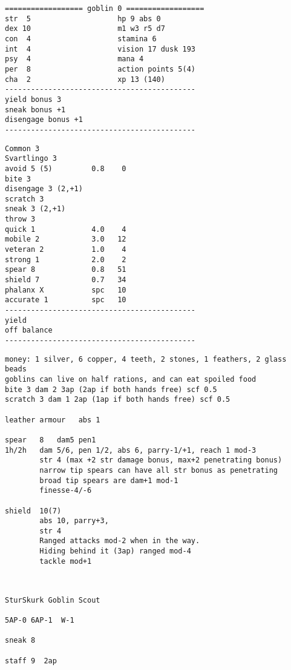 \begin{verbatim}
================== goblin 0 ==================
str  5                    hp 9 abs 0
dex 10                    m1 w3 r5 d7
con  4                    stamina 6
int  4                    vision 17 dusk 193
psy  4                    mana 4
per  8                    action points 5(4)
cha  2                    xp 13 (140)
--------------------------------------------
yield bonus 3
sneak bonus +1
disengage bonus +1
--------------------------------------------
\end{verbatim} \goodbreak \begin{verbatim}
Common 3
Svartlingo 3
avoid 5 (5)         0.8    0
bite 3
disengage 3 (2,+1)
scratch 3
sneak 3 (2,+1)
throw 3
quick 1             4.0    4
mobile 2            3.0   12
veteran 2           1.0    4
strong 1            2.0    2
spear 8             0.8   51
shield 7            0.7   34
phalanx X           spc   10
accurate 1          spc   10
--------------------------------------------
yield
off balance
--------------------------------------------
\end{verbatim} \goodbreak \begin{verbatim}
money: 1 silver, 6 copper, 4 teeth, 2 stones, 1 feathers, 2 glass beads
goblins can live on half rations, and can eat spoiled food
bite 3 dam 2 3ap (2ap if both hands free) scf 0.5
scratch 3 dam 1 2ap (1ap if both hands free) scf 0.5

leather armour   abs 1

spear   8   dam5 pen1
1h/2h   dam 5/6, pen 1/2, abs 6, parry-1/+1, reach 1 mod-3
        str 4 (max +2 str damage bonus, max+2 penetrating bonus)
        narrow tip spears can have all str bonus as penetrating
        broad tip spears are dam+1 mod-1
        finesse-4/-6

shield  10(7)
        abs 10, parry+3,
        str 4
        Ranged attacks mod-2 when in the way.
        Hiding behind it (3ap) ranged mod-4
        tackle mod+1



\end{verbatim} \pagebreak[2] \begin{verbatim}
SturSkurk Goblin Scout

5AP-0 6AP-1  W-1

sneak 8

staff 9  2ap


\end{verbatim}
